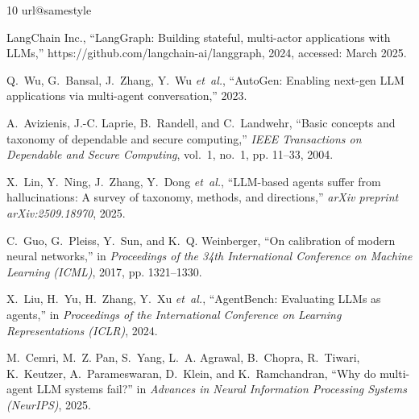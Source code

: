 \documentclass[journal,compsoc]{IEEEtran}
\begin{document}
\begin{thebibliography}{10}
\providecommand{\url}[1]{#1}
\csname url@samestyle\endcsname
\providecommand{\newblock}{\relax}
\providecommand{\bibinfo}[2]{#2}
\providecommand{\BIBentrySTDinterwordspacing}{\spaceskip=0pt\relax}
\providecommand{\BIBentryALTinterwordstretchfactor}{4}
\providecommand{\BIBentryALTinterwordspacing}{\spaceskip=\fontdimen2\font plus
\BIBentryALTinterwordstretchfactor\fontdimen3\font minus
  \fontdimen4\font\relax}
\providecommand{\BIBforeignlanguage}[2]{{%
\expandafter\ifx\csname l@#1\endcsname\relax
\typeout{** WARNING: IEEEtran.bst: No hyphenation pattern has been}%
\typeout{** loaded for the language `#1'. Using the pattern for}%
\typeout{** the default language instead.}%
\else
\language=\csname l@#1\endcsname
\fi
#2}}
\providecommand{\BIBdecl}{\relax}
\BIBdecl

{LangChain Inc.}, ``{LangGraph}: Building stateful, multi-actor applications
  with {LLMs},'' \url{https://github.com/langchain-ai/langgraph}, 2024,
  accessed: March 2025.

Q.~Wu, G.~Bansal, J.~Zhang, Y.~Wu \emph{et~al.}, ``{AutoGen}: Enabling next-gen
  {LLM} applications via multi-agent conversation,'' 2023.

A.~Avizienis, J.-C. Laprie, B.~Randell, and C.~Landwehr, ``Basic concepts and
  taxonomy of dependable and secure computing,'' \emph{IEEE Transactions on
  Dependable and Secure Computing}, vol.~1, no.~1, pp. 11--33, 2004.

X.~Lin, Y.~Ning, J.~Zhang, Y.~Dong \emph{et~al.}, ``{LLM}-based agents suffer
  from hallucinations: A survey of taxonomy, methods, and directions,''
  \emph{arXiv preprint arXiv:2509.18970}, 2025.

C.~Guo, G.~Pleiss, Y.~Sun, and K.~Q. Weinberger, ``On calibration of modern
  neural networks,'' in \emph{Proceedings of the 34th International Conference
  on Machine Learning (ICML)}, 2017, pp. 1321--1330.

X.~Liu, H.~Yu, H.~Zhang, Y.~Xu \emph{et~al.}, ``{AgentBench}: Evaluating {LLMs}
  as agents,'' in \emph{Proceedings of the International Conference on Learning
  Representations (ICLR)}, 2024.

M.~Cemri, M.~Z. Pan, S.~Yang, L.~A. Agrawal, B.~Chopra, R.~Tiwari, K.~Keutzer,
  A.~Parameswaran, D.~Klein, and K.~Ramchandran, ``Why do multi-agent {LLM}
  systems fail?'' in \emph{Advances in Neural Information Processing Systems
  ({NeurIPS})}, 2025.


\end{thebibliography}
\end{document}
